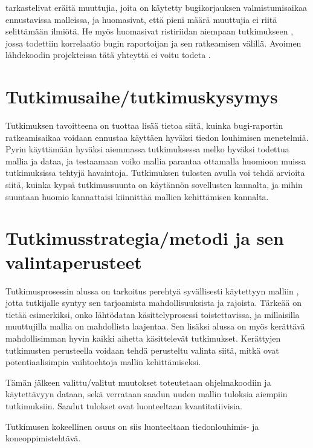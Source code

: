 \documentclass[utf8]{gradu3}
\begin{document}
\textcite{Bhattacharya-2011} tarkastelivat eräitä muuttujia, joita on käytetty
bugikorjauksen valmistumisaikaa ennustavissa malleissa, ja huomasivat, että
pieni määrä muuttujia ei riitä selittämään ilmiötä. He myös huomasivat
ristiriidan aiempaan tutkimukseen \parencite{Guo-2010}, jossa todettiin
korrelaatio bugin raportoijan ja sen ratkeamisen välillä. Avoimen lähdekoodin
projekteissa tätä yhteyttä ei voitu todeta \parencite{Bhattacharya-2011}.

\parencite[][Esim.]{Lamkanfi-2012,ardimento-2020,lee-2020} %

\chapter{Tutkimusaihe/tutkimuskysymys}
Tutkimuksen tavoitteena on tuottaa lisää tietoa siitä, kuinka bugi-raportin
ratkeamisaikaa voidaan ennustaa käyttäen hyväksi tiedon louhimisen menetelmiä.
Pyrin käyttämään hyväksi aiemmassa tutkimuksessa \parencite{riivo-2016} melko
hyväksi todettua mallia ja dataa, ja testaamaan voiko mallia parantaa ottamalla
huomioon muissa tutkimuksissa tehtyjä havaintoja. Tutkimuksen tulosten avulla
voi tehdä arvioita siitä, kuinka kypsä tutkimussuunta on käytännön sovellusten
kannalta, ja mihin suuntaan huomio kannattaisi kiinnittää mallien kehittämisen
kannalta.

\chapter{Tutkimusstrategia/metodi ja sen valintaperusteet}
Tutkimusprosessin alussa on tarkoitus perehtyä syvällisesti käytettyyn malliin
\parencite{riivo-2016}, jotta tutkijalle syntyy sen tarjoamista
mahdollisuuksista ja rajoista. Tärkeää on tietää esimerkiksi, onko lähtödatan
käsittelyprosessi toistettavissa, ja millaisilla muuttujilla mallia on
mahdollista laajentaa. Sen lisäksi alussa on myös kerättävä mahdollisimman hyvin
kaikki aihetta käsittelevät tutkimukset. Kerättyjen tutkimusten perusteella
voidaan tehdä perusteltu valinta siitä, mitkä ovat potentiaalisimpia
vaihtoehtoja mallin kehittämiseksi.

Tämän jälkeen valittu/valitut muutokset toteutetaan ohjelmakoodiin ja
käytettävyyn dataan, sekä verrataan saadun uuden mallin tuloksia aiempiin
tutkimuksiin. Saadut tulokset ovat luonteeltaan kvantitatiivisia. 

Tutkimusen kokeellinen osuus on siis luonteeltaan tiedonlouhimis- ja
koneoppimistehtävä.
\end{document}
